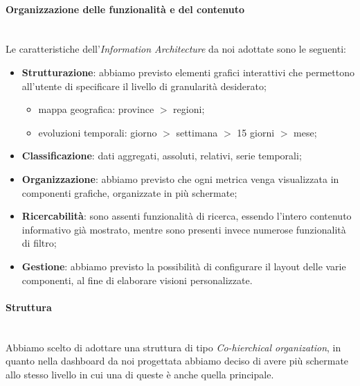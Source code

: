 \paragraph{Organizzazione delle funzionalità e del contenuto}\mbox{}\\
Le caratteristiche dell'\textit{Information Architecture} da noi adottate sono le seguenti:
\begin{itemize}
	\item \textbf{Strutturazione}: abbiamo previsto elementi grafici interattivi che permettono all'utente di specificare il livello di granularità desiderato;
	\begin{itemize}
		\item mappa geografica: province $>$ regioni;
		\item evoluzioni temporali: giorno $>$ settimana $>$ 15 giorni $>$ mese;
	\end{itemize}
	\item \textbf{Classificazione}: dati aggregati, assoluti, relativi, serie temporali;
	\item \textbf{Organizzazione}: abbiamo previsto che ogni metrica venga visualizzata in componenti grafiche, organizzate in più schermate;
	\item \textbf{Ricercabilità}: sono assenti funzionalità di ricerca, essendo l'intero contenuto informativo già mostrato, mentre sono presenti invece numerose funzionalità di filtro;
	\item \textbf{Gestione}: abbiamo previsto la possibilità di configurare il layout delle varie componenti, al fine di elaborare visioni personalizzate.
\end{itemize}

\paragraph{Struttura}\mbox{}\\
Abbiamo scelto di adottare una struttura di tipo \textit{Co-hierchical organization}, in quanto nella dashboard da noi progettata abbiamo deciso di avere più schermate allo stesso livello in cui una di queste è anche quella principale.